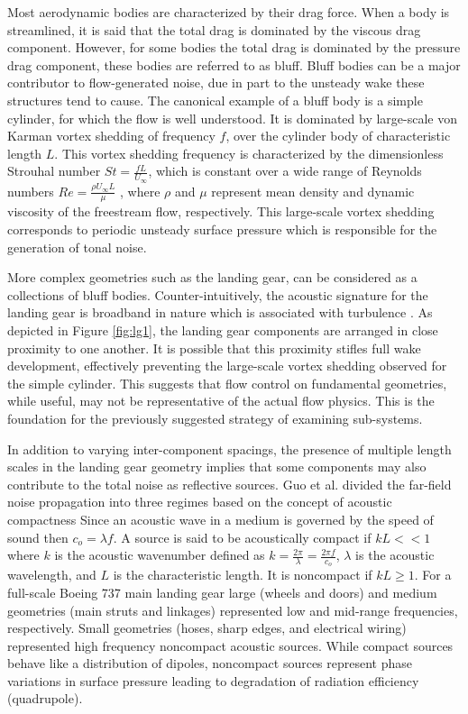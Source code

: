    Most aerodynamic bodies are characterized by their drag force. When a body is streamlined, it is said that the total drag is dominated by the viscous drag component.  However, for some bodies the total drag is dominated by the pressure drag component, these bodies are referred to as bluff. Bluff bodies can be a major contributor to flow-generated noise, due in part to the unsteady wake these structures tend to cause. The canonical example of a bluff body is a simple cylinder, for which the flow is well understood. It is dominated by large-scale von Karman vortex shedding of frequency $f$, over the cylinder body of characteristic length $L$. This vortex shedding frequency is characterized by the dimensionless Strouhal number $St = \frac{fL}{U_\infty}$, which is constant over a wide range of Reynolds numbers $Re = \frac{\rho U_\infty L}{\mu}$ \cite{bearman1969}, where $\rho$ and $\mu$ represent mean density and dynamic viscosity of the freestream flow, respectively. This large-scale vortex shedding corresponds to periodic unsteady surface pressure which is responsible for the generation of tonal noise. 
    
More complex geometries such as the landing gear, can be considered as a collections of bluff bodies. Counter-intuitively, the acoustic signature for the landing gear is broadband in nature which is associated with turbulence \cite{astley2008}. As depicted in Figure \ref{fig:lg1}, the landing gear components are arranged in close proximity to one another. It is possible that this proximity stifles full wake development, effectively preventing the large-scale vortex shedding observed for the simple cylinder. This suggests that flow control on fundamental geometries, while useful, may not be representative of the actual flow physics. This is the foundation for the previously suggested strategy of examining sub-systems. 

In addition to varying inter-component spacings, the presence of multiple length scales in the landing gear geometry implies that some components may also contribute to the total noise as reflective sources. Guo et al. divided the far-field noise propagation into three regimes based on the concept of acoustic compactness \cite{guo2006} Since an acoustic wave in a medium is governed by the speed of sound then $c_o = \lambda f$. A source is said to be acoustically compact if $kL << 1$ where $k$ is the acoustic wavenumber defined as $k = \frac{2 \pi}{\lambda} = \frac{2 \pi f}{c_o}$, $\lambda$ is the acoustic wavelength, and $L$ is the characteristic length. It is noncompact if $kL \geq 1$. For a full-scale Boeing 737 main landing gear large (wheels and doors) and medium geometries (main struts and linkages) represented low and mid-range frequencies, respectively. Small geometries (hoses, sharp edges, and electrical wiring) represented high frequency noncompact acoustic sources. While compact sources behave like a distribution of dipoles, noncompact sources represent phase variations in surface pressure leading to degradation of radiation efficiency (quadrupole). 

